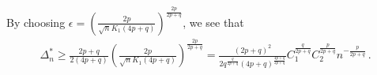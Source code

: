 % 
% 
% 

 
By choosing $\epsilon = \left(\frac{2p}{\sqrt{n} K_1(4p+q)} \right)^{\frac{2p}{2p+q}}$, we see that 
\begin{align}
\Delta_n^* \ge \frac{2p+q}{2(4p+q)}\left(\frac{2p}{\sqrt{n} K_1(4p+q)} \right)^{\frac{2p}{2p+q}} = \frac{\left(2p+q\right)^2}{2q^{\frac{q}{2p+q}}\left(4p+q\right)^{\frac{4p+q}{2p+q}}}C_1^{\frac{q}{2p+q}} C_2^{\frac{p}{2p+q}}  n^{-\tfrac{p}{2p+q}} \,.
\label{eq:lb-pq}
\end{align}

